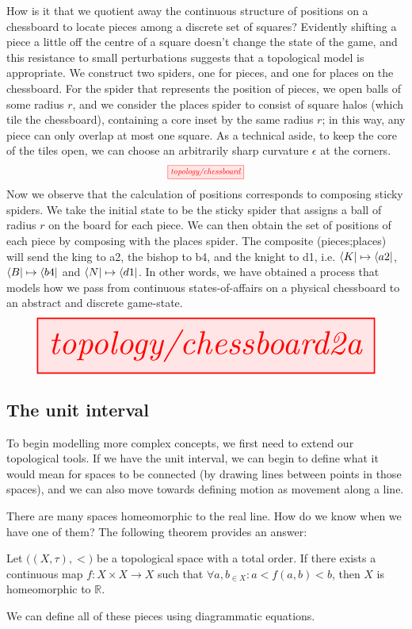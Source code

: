 \begin{fullwidth}
\begin{example}
How is it that we quotient away the continuous structure of positions on a chessboard to locate pieces among a discrete set of squares? Evidently shifting a piece a little off the centre of a square doesn't change the state of the game, and this resistance to small perturbations suggests that a topological model is appropriate. We construct two spiders, one for pieces, and one for places on the chessboard. For the spider that represents the position of pieces, we open balls of some radius $r$, and we consider the places spider to consist of square halos (which tile the chessboard), containing a core inset by the same radius $r$; in this way, any piece can only overlap at most one square. As a technical aside, to keep the core of the tiles open, we can choose an arbitrarily sharp curvature $\epsilon$ at the corners.
\[\scalebox{0.75}{\tikzfig{topology/chessboard}}\]
Now we observe that the calculation of positions corresponds to composing sticky spiders. We take the initial state to be the sticky spider that assigns a ball of radius $r$ on the board for each piece. We can then obtain the set of positions of each piece by composing with the places spider. The composite (pieces;places)
will send the king to a2, the bishop to b4, and the knight to d1, i.e. $\bra{K} \mapsto \bra{a2}$, $\bra{B} \mapsto \bra{b4}$ and $\bra{N} \mapsto \bra{d1}$. In other words, we have obtained a process that models how we pass from continuous states-of-affairs on a physical chessboard to an abstract and discrete game-state.
\[\resizebox{\textwidth}{!}{\tikzfig{topology/chessboard2a}}\]
\end{example}
\newpage

\subsection{The unit interval}\label{sec:interval}
To begin modelling more complex concepts, we first need to extend our topological tools. If we have the unit interval, we can begin to define what it would mean for spaces to be connected (by drawing lines between points in those spaces), and we can also move towards defining motion as movement along a line.

 There are many spaces homeomorphic to the real line. How do we know when we have one of them? The following theorem provides an answer:
\begin{theorem}[Friedman]\label{thm:Friedman}
Let $\big((X,\tau), < \big)$ be a topological space with a total order. If there exists a continuous map $f: X \times X \rightarrow X$ such that $\forall a,b_{\in X} : a < f(a,b) < b$, then $X$ is homeomorphic to $\mathbb{R}$.
\end{theorem}
We can define all of these pieces using diagrammatic equations.


\end{fullwidth}
